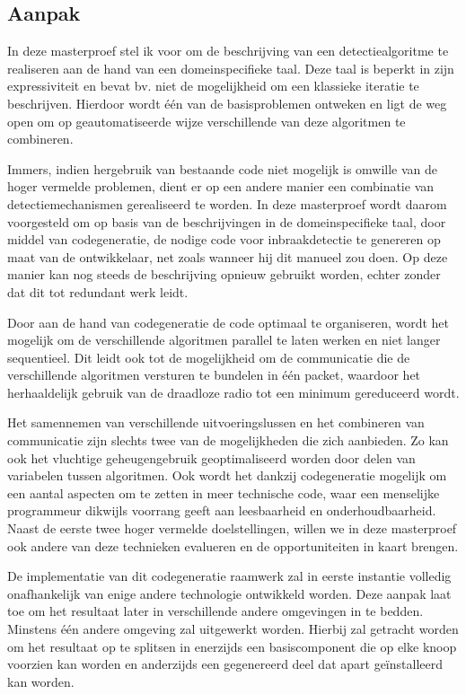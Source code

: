 \documentclass[12pt,a4paper]{article}
\begin{document}
\subsection*{Aanpak}

In deze masterproef stel ik voor om de beschrijving van een detectiealgoritme te
realiseren aan de hand van een domeinspecifieke taal. Deze taal is beperkt in
zijn expressiviteit en bevat bv. niet de mogelijkheid om een klassieke iteratie
te beschrijven. Hierdoor wordt \'e\'en van de basisproblemen ontweken en ligt
de weg open om op geautomatiseerde wijze verschillende van deze algoritmen te
combineren.

Immers, indien hergebruik van bestaande code niet mogelijk is omwille van de
hoger vermelde problemen, dient er op een andere manier een combinatie van
detectiemechanismen gerealiseerd te worden. In deze masterproef wordt daarom
voorgesteld om op basis van de beschrijvingen in de domeinspecifieke taal, door
middel van codegeneratie, de nodige code voor inbraakdetectie te genereren op
maat van de ontwikkelaar, net zoals wanneer hij dit manueel zou doen. Op deze
manier kan nog steeds de beschrijving opnieuw gebruikt worden, echter zonder
dat dit tot redundant werk leidt.

Door aan de hand van codegeneratie de code optimaal te organiseren, wordt het
mogelijk om de verschillende algoritmen parallel te laten werken en niet langer
sequentieel. Dit leidt ook tot de mogelijkheid om de communicatie die de
verschillende algoritmen versturen te bundelen in \'e\'en packet, waardoor het
herhaaldelijk gebruik van de draadloze radio tot een minimum gereduceerd wordt.

Het samennemen van verschillende uitvoeringslussen en het combineren van
communicatie zijn slechts twee van de mogelijkheden die zich aanbieden. Zo kan
ook het vluchtige geheugengebruik geoptimaliseerd worden door delen van
variabelen tussen algoritmen. Ook wordt het dankzij codegeneratie mogelijk om
een aantal aspecten om te zetten in meer technische code, waar een menselijke
programmeur dikwijls voorrang geeft aan leesbaarheid en onderhoudbaarheid.
Naast de eerste twee hoger vermelde doelstellingen, willen we in deze masterproef
ook andere van deze technieken evalueren en de opportuniteiten in kaart brengen.

De implementatie van dit codegeneratie raamwerk zal in eerste instantie
volledig onafhankelijk van enige andere technologie ontwikkeld worden. Deze
aanpak laat toe om het resultaat later in verschillende andere omgevingen in te
bedden. Minstens \'e\'en andere omgeving zal uitgewerkt worden. Hierbij zal
getracht worden om het resultaat op te splitsen in enerzijds een basiscomponent
die op elke knoop voorzien kan worden en anderzijds een gegenereerd deel dat
apart ge\"installeerd kan worden.
\end{document}
